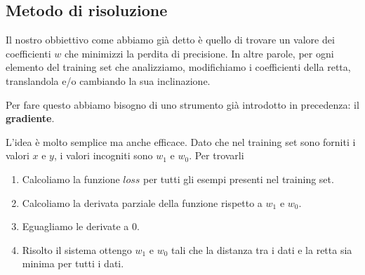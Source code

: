 \subsection{Metodo di risoluzione}
Il nostro obbiettivo come abbiamo gi\`a detto \`e quello di trovare un valore dei coefficienti $w$ che minimizzi la perdita
di precisione. In altre parole, per ogni elemento del training set che analizziamo, modifichiamo i coefficienti della retta,
translandola e/o cambiando la sua inclinazione.

Per fare questo abbiamo bisogno di uno strumento gi\`a introdotto in precedenza: il \textbf{gradiente}.

L'idea \`e molto semplice ma anche efficace. Dato che nel training set sono forniti i valori $x$ e $y$, i valori incogniti
sono $w_1$ e $w_0$. Per trovarli
\begin{enumerate}
	\item Calcoliamo la funzione $loss$ per tutti gli esempi presenti nel training set.
	\item Calcoliamo la derivata parziale della funzione rispetto a $w_1$ e $w_0$.
	\item Eguagliamo le derivate a 0.
	\item Risolto il sistema ottengo $w_1$ e $w_0$ tali che la distanza tra i dati e la retta sia minima per tutti i dati.
\end{enumerate}